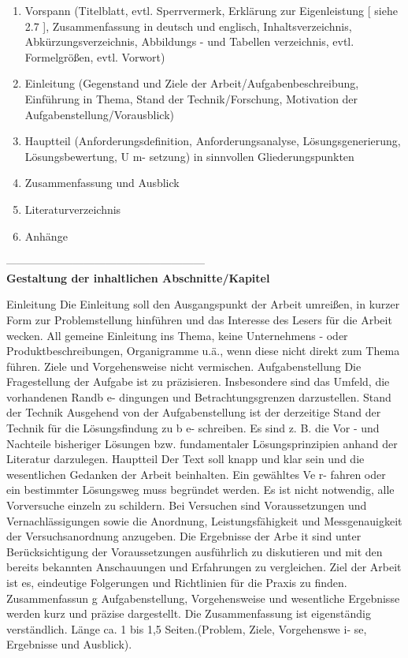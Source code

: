 \begin{enumerate}
\item Vorspann (Titelblatt, evtl.  Sperrvermerk, Erklärung 
zur Eigenleistung 
[
siehe  2.7
], 
Zusammenfassung
in 
deutsch und englisch, Inhaltsverzeichnis, Abkürzungsverzeichnis, Abbildungs
-
und Tabellen
verzeichnis, 
evtl. Formelgrößen, evtl. Vorwort)

\item Einleitung  (Gegenstand  und  Ziele  der  Arbeit/Aufgabenbeschreibung,  Einführung  in  Thema,  Stand  der 
Technik/Forschung, Motivation der Aufgabenstellung/Vorausblick)
\item 
Hauptteil  (Anforderungsdefinition, 
Anforderungsanalyse,  Lösungsgenerierung,  Lösungsbewertung,  U
m-
setzung) in sinnvollen Gliederungspunkten
\item 
Zusammenfassung und Ausblick
\item 
Literaturverzeichnis
\item 
Anhänge

\end{enumerate}

------------------------------------------------------\\
\textbf{Gestaltung der inhaltlichen Abschnitte/Kapitel}

Einleitung
Die Einleitung soll den Ausgangspunkt der Arbeit umreißen, in kurzer Form zur Problemstellung hinführen 
und das Interesse des Lesers für die Arbeit wecken.
All
gemeine Einleitung ins Thema, keine Unternehmens
-
oder Produktbeschreibungen, Organigramme u.ä., wenn diese nicht direkt zum Thema führen.
Ziele und Vorgehensweise nicht vermischen.
Aufgabenstellung
Die Fragestellung der Aufgabe ist zu präzisieren. 
Insbesondere sind das Umfeld, die vorhandenen Randb
e-
dingungen und Betrachtungsgrenzen darzustellen.
Stand der Technik
Ausgehend von der Aufgabenstellung ist der derzeitige Stand der Technik für die Lösungsfindung zu b
e-
schreiben. Es sind z. B. die Vor
-
und 
Nachteile bisheriger Lösungen bzw. fundamentaler Lösungsprinzipien 
anhand der Literatur darzulegen.
Hauptteil
Der Text soll knapp und klar sein und die wesentlichen Gedanken der Arbeit beinhalten. Ein gewähltes Ve
r-
fahren oder ein bestimmter Lösungsweg muss
begründet werden. Es ist nicht notwendig, alle Vorversuche 
einzeln zu schildern. Bei Versuchen sind Voraussetzungen und Vernachlässigungen sowie die Anordnung, 
Leistungsfähigkeit und Messgenauigkeit der Versuchsanordnung anzugeben.
Die Ergebnisse der Arbe
it sind unter Berücksichtigung der Voraussetzungen ausführlich zu diskutieren und 
mit den bereits bekannten Anschauungen und Erfahrungen zu vergleichen.
Ziel der Arbeit ist es, eindeutige Folgerungen und Richtlinien für die Praxis zu finden.
Zusammenfassun
g 
Aufgabenstellung, Vorgehensweise und wesentliche Ergebnisse werden kurz und präzise dargestellt. 
Die 
Zusammenfassung ist eigenständig verständlich. Länge ca. 1 bis 1,5 Seiten.(Problem, Ziele, Vorgehenswe
i-
se, Ergebnisse und Ausblick).